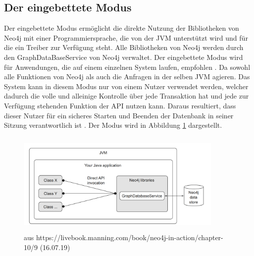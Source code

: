 \subsection{Der eingebettete Modus}
Der eingebettete Modus ermöglicht die direkte Nutzung der  Bibliotheken von Neo4j mit einer Programmiersprache, die von der JVM unterstützt wird und für die ein Treiber zur Verfügung steht. Alle Bibliotheken von Neo4j werden durch den GraphDataBaseService von Neo4j verwaltet. Der eingebettete Modus wird für Anwendungen, die auf einem einzelnen System laufen, empfohlen \parencite{raj2015neo4j}. Da sowohl alle Funktionen von Neo4j als auch die Anfragen in der selben JVM agieren. Das System kann in diesem Modus nur von einem Nutzer verwendet werden, welcher dadurch die volle und alleinige Kontrolle über jede Transaktion hat und  jede zur Verfügung stehenden Funktion der API nutzen kann. Daraus resultiert, dass dieser Nutzer für ein sicheres Starten und Beenden der Datenbank in seiner Sitzung verantwortlich ist \parencite{robinson2013graph}. Der Modus wird in Abbildung \ref{fig:Embedded} dargestellt.
\FloatBarrier
\begin{figure}[!htb]
	\centering	
	\includegraphics [width=10cm, height=5cm]{Figures/embedded}
	\caption[Eingebetteter Modus]{aus https://livebook.manning.com/book/neo4j-in-action/chapter-10/9 (16.07.19)}
	\label{fig:Embedded}
\end{figure}
\FloatBarrier
